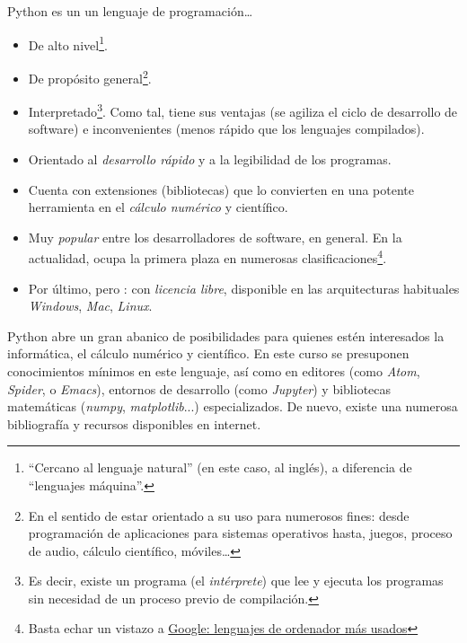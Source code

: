 Python es un un lenguaje de programación\ldots{}
\begin{itemize}
\item De alto nivel\footnote{``Cercano al lenguaje
    natural'' (en este caso, al inglés), a diferencia de
    ``lenguajes máquina''.}.
\item De propósito general\footnote{En el sentido de estar orientado a
    su uso para numerosos fines: desde programación de aplicaciones para
    sistemas operativos hasta, juegos, proceso de audio, cálculo
    científico, móviles\ldots{}}.
\item Interpretado\footnote{Es decir, existe un programa (el
    \emph{intérprete}) que lee y ejecuta los programas sin necesidad
    de un proceso previo de compilación.}. Como tal, tiene sus ventajas
  (se agiliza el ciclo de desarrollo de software) e inconvenientes
  (menos rápido que los lenguajes compilados).
\item Orientado al \emph{desarrollo rápido} y a la legibilidad de los programas.
\item Cuenta con extensiones (bibliotecas) que lo convierten en una
      potente herramienta en el \emph{cálculo numérico} y científico.
    \item Muy \emph{popular} entre los desarrolladores de software, en
      general. En la actualidad, ocupa la primera plaza en numerosas
      clasificaciones\footnote{Basta echar un vistazo a \href{https://www.google.com/search?channel=fs&client=ubuntu&q=lenguajes+de+ordenador+m\%C3\%A1s+usados}{Google: lenguajes de ordenador más usados}}.
    \item Por último, pero : con \emph{licencia libre},
  disponible en las arquitecturas habituales \emph{Windows},
  \emph{Mac}, \emph{Linux}.
\end{itemize}

Python abre un gran abanico de posibilidades para quienes estén
interesados la informática, el cálculo numérico y científico. En este
curso se presuponen conocimientos mínimos en este lenguaje, así como
en editores (como \textit{Atom}, \textit{Spider}, o \textit{Emacs}),
entornos de desarrollo (como \textit{Jupyter}) y bibliotecas
matemáticas (\textit{numpy}, \textit{matplotlib}...)
especializados. De nuevo, existe una numerosa bibliografía y recursos
disponibles en internet.

